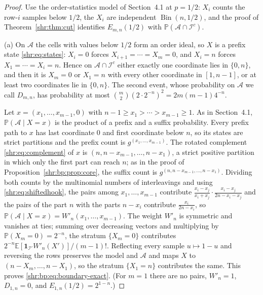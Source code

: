 \documentclass[11pt,letterpaper]{article}
\numberwithin{equation}{section}
\theoremstyle{definition}
\newcommand{\E}{\mathbb E}
\newcommand{\Pp}{\mathbb P}
\newcommand{\1}{\mathbf 1}
\newcommand{\ind}{\mathbf 1}
\begin{document}
\begin{proof}
Use the order-statistics model of Section~4.1 at $p=1/2$: $X_i$ counts the
row-$i$ samples below $1/2$, the $X_i$ are independent
$\operatorname{Bin}(n,1/2)$, and the proof of Theorem~\ref{shr:thm:cut}
identifies $E_{m,n}(1/2)$ with $\Pp(\mathcal A\cap\mathcal I^c)$.

(a) On $\mathcal A$ the cells with values below $1/2$ form an order ideal,
so $X$ is a prefix state \eqref{shr:eq:states}: $X_i=0$ forces
$X_{i+1}=\cdots=X_m=0$, and $X_i=n$ forces $X_1=\cdots=X_i=n$. Hence on
$\mathcal A\cap\mathcal I^c$ either exactly one coordinate lies in
$\{0,n\}$, and then it is $X_m=0$ or $X_1=n$ with every other coordinate
in $[1,n-1]$, or at least two coordinates lie in $\{0,n\}$. The second
event, whose probability on $\mathcal A$ we call $D_{m,n}$, has
probability at most $\binom m2(2\cdot2^{-n})^2=2m(m-1)4^{-n}$.

Let $x=(x_1,\ldots,x_{m-1},0)$ with $n-1\ge x_1>\cdots>x_{m-1}\ge1$. As in
Section~4.1, $\Pp(\mathcal A\mid X=x)$ is the product of a prefix and a
suffix probability. Every prefix path to $x$ has last coordinate $0$ and
first coordinate below $n$, so its states are strict partitions and the
prefix count is $g^{(x_1,\ldots,x_{m-1})}$. The rotated complement
\eqref{shr:eq:complement} of $x$ is $(n,n-x_{m-1},\ldots,n-x_1)$, a strict
positive partition in which only the first part can reach $n$; as in the
proof of Proposition~\ref{shr:bp:prop:core}, the suffix count is
$g^{(n,n-x_{m-1},\ldots,n-x_1)}$. Dividing both counts by the multinomial
numbers of interleavings and using \eqref{shr:eq:shiftedhook}, the pairs
among $x_1,\ldots,x_{m-1}$ contribute
$\frac{x_i-x_j}{x_i+x_j}\cdot\frac{x_i-x_j}{2n-x_i-x_j}$ and the pairs of
the part $n$ with the parts $n-x_i$ contribute $\frac{x_i}{2n-x_i}$, so
$\Pp(\mathcal A\mid X=x)=W'_n(x_1,\ldots,x_{m-1})$. The weight $W'_n$ is
symmetric and vanishes at ties; summing over decreasing vectors and
multiplying by $\Pp(X_m=0)=2^{-n}$, the stratum $\{X_m=0\}$ contributes
$2^{-n}\E[\ind_{\mathcal I'}W'_n(X')]/(m-1)!$. Reflecting every sample
$u\mapsto1-u$ and reversing the rows preserves the model and $\mathcal A$
and maps $X$ to $(n-X_m,\ldots,n-X_1)$, so the stratum $\{X_1=n\}$
contributes the same. This proves \eqref{shr:bp:eq:boundary-exact}. (For
$m=1$ there are no pairs, $W'_n=1$, $D_{1,n}=0$, and
$E_{1,n}(1/2)=2^{1-n}$.)


\end{proof}
\end{document}
